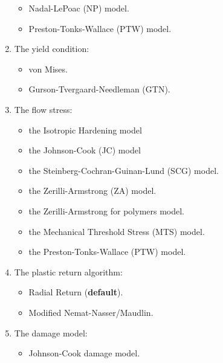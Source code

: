 \begin{enumerate}
\begin{itemize}
        \item Nadal-LePoac (NP) model.
        \item Preston-Tonks-Wallace (PTW) model.
      \end{itemize}
    \item The yield condition:
      \begin{itemize}
        \item von Mises.
        \item Gurson-Tvergaard-Needleman (GTN).
      \end{itemize}
    \item The flow stress:
      \begin{itemize}
        \item the Isotropic Hardening model
        \item the Johnson-Cook (JC) model
        \item the Steinberg-Cochran-Guinan-Lund (SCG) model.
        \item the Zerilli-Armstrong (ZA) model.
        \item the Zerilli-Armstrong for polymers model.
        \item the Mechanical Threshold Stress (MTS) model.
        \item the Preston-Tonks-Wallace (PTW) model.
      \end{itemize}
    \item The plastic return algorithm:
      \begin{itemize}
        \item Radial Return ({\bf default}).
        \item Modified Nemat-Nasser/Maudlin.
      \end{itemize}
    \item The damage model:
      \begin{itemize}
        \item Johnson-Cook damage model.
      \end{itemize}
\end{enumerate}

